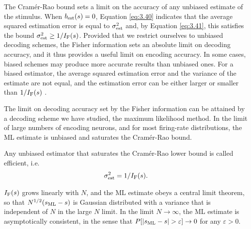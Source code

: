 \begin{rem}
  The Cramér-Rao bound sets a limit on the accuracy of any unbiased estimate of the stimulus. When $b_{\rm{est}}(s)=0$, Equation
\ref{eq:3.40} indicates that the average squared estimation error is
equal to $\sigma_{\rm{est}}^{2}$ and, by Equation \ref{eq:3.41}, this
satisfies the bound $\sigma_{\rm{est}}^{2} \geq
1/I_{\rm{F}}(s)$. Provided that we restrict ourselves to unbiased
decoding schemes, the Fisher information sets an absolute limit on
decoding accuracy, and it thus provides a useful limit on encoding
accuracy. In some cases, biased schemes may produce more accurate
results than unbiased ones. For a biased estimator, the average
squared estimation error and the variance of the estimate are not
equal, and the estimation error can be either larger or smaller than $1/I_{\rm{F}}(s)$ .
\end{rem}

\begin{rem}
  The limit on decoding accuracy set by the Fisher information can be
  attained by a decoding scheme we have studied, the maximum
  likelihood method. In the limit of large numbers of encoding
  neurons, and for most firing-rate distributions, the ML estimate is unbiased and saturates the
Cramér-Rao bound.
\end{rem}

\begin{defn}
  \label{defn:efficient estimator}
  Any unbiased estimator that saturates the Cramér-Rao lower bound is
  called efficient, i.e.
  \begin{equation}
    \sigma_{\rm{est}}^{2} =1/I_{\rm{F}}(s).
  \end{equation}
\end{defn}
\begin{thm}
 $I_{\rm{F}}(s)$ grows linearly with $N$, and the ML estimate obeys a
central limit theorem, so that $N^{1/2}(s_{\rm{ML}}-s)$ is Gaussian
distributed with a variance that is independent of $N$ in the large
$N$ limit. In the limit
$N \rightarrow \infty$, the ML estimate is asymptotically consistent, in the sense that
$P[|s_{\rm{ML}}-s|>\varepsilon]\rightarrow 0$ for any $\varepsilon >0$.
\end{thm}

